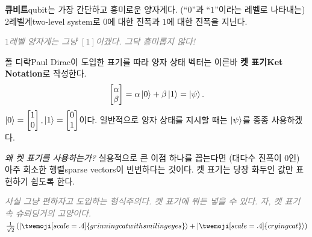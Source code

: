 \documentclass[a4paper,chapter,atbegshi,]{oblivoir}
\begin{document}
\hfill\break

\textbf{큐비트}{\footnotesize qubit}는 가장 간단하고 흥미로운 양자계다.
(``$0$''과 ``$1$''이라는 레벨로 나타내는) 2레벨계{\footnotesize two-level
system}로 $0$에 대한 진폭과 $1$에 대한 진폭을 지닌다.

\hfill

\hfill\parbox[t]{9cm}{\itshape\textcolor{gray}{$1$레벨 양자계는 그냥 $[1]$이겠다.
그닥 흥미롭지 않다!}}

\hfill

폴 디락{\footnotesize Paul Dirac}이 도입한 표기를 따라 양자 상태 벡터는
이른바 \textbf{켓 표기{\footnotesize Ket Notation}}로 작성한다. 
\[
  \begin{bmatrix}\alpha\\\beta\end{bmatrix} 
  = \alpha\ket{0}+\beta\ket{1}=\ket{\psi}.
\]
$\ket0=\begin{bmatrix}1\\0\end{bmatrix}, \ket1=\begin{bmatrix}0\\1
\end{bmatrix}$이다. 일반적으로 양자 상태를 지시할 때는 $\ket{\psi}$를 종종
사용하겠다.

\emph{왜 켓 표기를 사용하는가?} 실용적으로 큰 이점 하나를 꼽는다면 (대다수 진폭이
$0$인) 아주 희소한 행렬{\footnotesize sparse vectors}이 빈번하다는 것이다.
켓 표기는 당장 화두인 값만 표현하기 쉽도록 한다.

\hfill

\hfill\parbox[t]{9cm}{\itshape\textcolor{gray}{사실 그냥 편하자고 도입하는
형식주의다. 켓 표기에 뭐든 넣을 수 있다. 자, 켓 표기 속 슈뢰딩거의 고양이다.
$\frac{1}{\sqrt2}\left(\ket{\twemoji[scale=.4]{grinning cat with smiling eyes}}
  +\ket{\twemoji[scale=.4]{crying cat}}\right)$}}
\end{document}
